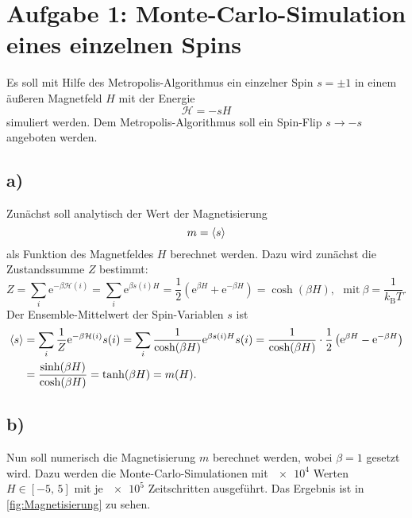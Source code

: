 
\section*{Aufgabe 1: Monte-Carlo-Simulation eines einzelnen Spins}
Es soll mit Hilfe des Metropolis-Algorithmus ein einzelner Spin $s=\pm1$ in einem äußeren Magnetfeld $H$ mit der Energie \[\mathcal{H}=-sH\] simuliert werden.
Dem Metropolis-Algorithmus soll ein Spin-Flip $s\rightarrow-s$ angeboten werden.
\subsection*{a)}
Zunächst soll analytisch der Wert der Magnetisierung \[m=\braket{s}\] als Funktion des Magnetfeldes $H$ berechnet werden.
Dazu wird zunächst die Zustandssumme $Z$ bestimmt: \[Z=\sum_{i}\mathrm{e}^{-\beta\mathcal{H}(i)}=\sum_{i}\mathrm{e}^{\beta s(i)H}=\frac{1}{2}\left(\mathrm{e}^{\beta H}+\mathrm{e}^{-\beta H}\right)=\cosh(\beta H),~~~\text{mit}~\beta=\frac{1}{k_\text{B}T}.\]
Der Ensemble-Mittelwert der Spin-Variablen $s$ ist
\begin{align*}\braket{s}&=\sum_{i}\frac{1}{Z}\mathrm{e}^{-\beta\mathcal{H}(i)}s(i)=\sum_{i}\frac{1}{\cosh(\beta H)}\mathrm{e}^{\beta s(i)H}s(i)=\frac{1}{\cosh(\beta H)}\cdot\frac{1}{2}\left(\mathrm{e}^{\beta H}-\mathrm{e}^{-\beta H}\right)\\
&=\frac{\sinh(\beta H)}{\cosh(\beta H)}=\tanh(\beta H)=m(H).\end{align*}

\subsection*{b)}
Nun soll numerisch die Magnetisierung $m$ berechnet werden, wobei $\beta=1$ gesetzt wird.
Dazu werden die Monte-Carlo-Simulationen mit $\num{e4}$ Werten $H\in[-5,\,5]$ mit je $\num{e5}$ Zeitschritten ausgeführt.
Das Ergebnis ist in \cref{fig:Magnetisierung} zu sehen.\newpage

